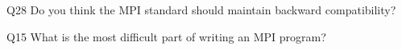 \begin{description}%
\item{Q28} Do you think the MPI standard should maintain backward compatibility?%
\item{Q15} What is the most difficult part of writing an MPI program?%
\end{description}%
